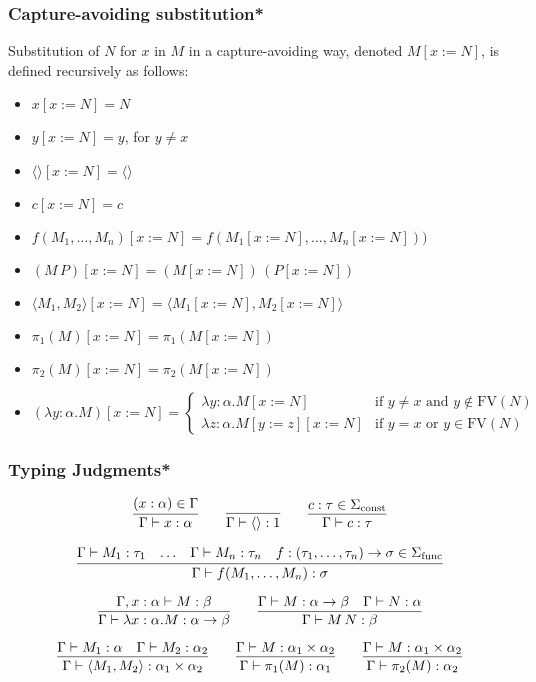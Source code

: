 \documentclass[aspectratio=169]{beamer}
\begin{document}
\begin{frame}
\frametitle{Capture-avoiding substitution*}

Substitution of $N$ for $x$ in $M$ in a capture-avoiding way, denoted $M[x := N]$, is defined recursively as follows:

\begin{itemize}
    \item $x[x := N] = N$
    \item $y[x := N] = y$, for $y \neq x$
    \item $\langle \rangle[x := N] = \langle \rangle$
    \item $c[x := N] = c$
    \item $f(M_1, \ldots, M_n)[x := N] = f(M_1[x := N], \ldots, M_n[x := N]))$
    \item $(M \, P)[x := N] = (M[x := N]) \, (P[x := N])$
    \item $\langle M_1 , M_2 \rangle[x := N] = \langle M_1[x := N], M_2[x := N] \rangle$
    \item $\pi_1(M)[x := N] = \pi_1(M[x := N])$
    \item $\pi_2(M)[x := N] = \pi_2(M[x := N])$
    \item $(\lambda y : \alpha. M)[x := N] =
    \begin{cases}
    \lambda y : \alpha. M[x := N] & \text{if } y \neq x \text{ and } y \notin \text{FV}(N) \\
    \lambda z : \alpha. M[y := z][x := N] & \text{if } y = x \text{ or } y \in \text{FV}(N)
    \end{cases}$
\end{itemize}
\end{frame}

\begin{frame}
\frametitle{Typing Judgments*}

\[
\infer{\Gamma \vdash x : \alpha}{(x : \alpha) \in \Gamma}
\qquad
\infer{\Gamma \vdash \langle \rangle : 1}{}
\qquad
\infer{\Gamma \vdash c : \tau}{c : \tau \in \Sigma_{\text{const}}}
\]

\[
\infer{\Gamma \vdash f(M_1, \ldots, M_n) : \sigma}{\Gamma \vdash M_1 : \tau_1 & \ldots & \Gamma \vdash M_n : \tau_n & f : (\tau_1, \ldots, \tau_n) \rightarrow \sigma \in \Sigma_{\text{func}}}
\]

\[
\infer{\Gamma \vdash \lambda x : \alpha. M : \alpha \rightarrow \beta}{\Gamma, x : \alpha \vdash M : \beta}
\qquad
\infer{\Gamma \vdash M \, N : \beta}{\Gamma \vdash M : \alpha \rightarrow \beta & \Gamma \vdash N : \alpha}
\]

\[
\infer{\Gamma \vdash \langle M_1, M_2 \rangle : \alpha_1 \times \alpha_2}{\Gamma \vdash M_1 : \alpha & \Gamma \vdash M_2 : \alpha_2}
\qquad
\infer{\Gamma \vdash \pi_1(M) : \alpha_1}{\Gamma \vdash M : \alpha_1 \times \alpha_2}
\qquad
\infer{\Gamma \vdash \pi_2(M) : \alpha_2}{\Gamma \vdash M : \alpha_1 \times \alpha_2}
\]
\end{frame}
\end{document}
